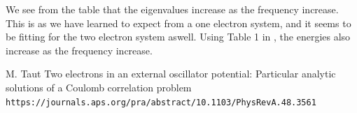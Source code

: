 \documentclass{article}
\begin{document}
We see from the table that the eigenvalues increase as the frequency increase. This is as we have learned to expect from a one electron system, and it seems to be fitting for the two electron system aswell. Using Table 1 in \cite{M.Tant}, the energies also increase as the frequency increase.

\begin{thebibliography}{}
M. Taut Two electrons in an external oscillator potential: Particular analytic solutions of a Coulomb correlation problem
\\\texttt{https://journals.aps.org/pra/abstract/10.1103/PhysRevA.48.3561}

\end{thebibliography}
\end{document}
